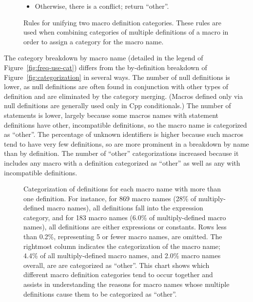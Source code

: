 \documentclass[10pt]{article}
\newcommand{\captionsmall}[1]{\caption[]{\small #1}}
\begin{document}
\begin{figure}
\begin{itemize}
\item Otherwise, there is a conflict; return ``other''.
\end{itemize}


\captionsmall{Rules for unifying two macro definition categories.  These
  rules are used when combining categories of multiple definitions of a
  macro in order to assign a category for the macro name.}
\label{fig:category-lub}
\end{figure}



The category breakdown by macro name (detailed in the legend of
Figure~\ref{fig:freq-use-cat}) differs from the by-definition breakdown of
Figure~\ref{fig:categorization} in several ways.  The number of null
definitions is lower, as null definitions are often found in conjunction
with other types of definition and are eliminated by the category merging.
(Macros defined only via null definitions are generally used only in Cpp
conditionals.)  The number of statements is lower, largely because
some macros names with statement definitions have other, incompatible
definitions, so the macro name is categorized as ``other''.  The percentage
of unknown identifiers is higher because such macros tend to have very few
definitions, so are more prominent in a breakdown by name than by
definition.  The number of ``other'' categorizations increased because it
includes any macro with a definition categorized as ``other'' as well as any
with incompatible definitions.


\begin{figure}
  {\small\centerline{}}
  
  \captionsmall{Categorization of definitions for each macro name with more
    than one definition.
    For instance, for 869 macro names (28\% of multiply-defined macro
    names), all definitions fall into the expression category, and for 183
    macro names (6.0\% of multiply-defined macro names), all definitions
    are either expressions or constants.
    Rows less than 0.2\%, representing 5 or fewer macro names, are omitted.
    The rightmost column indicates the categorization of the macro name; 
    4.4\% of all multiply-defined macro names, and 2.0\% macro names
    overall, are are categorized as ``other''.
    This chart shows which different macro definition categories tend
    to occur together and assists in understanding the reasons for macro names
    whose multiple definitions cause them to be categorized as ``other''.}

  \label{fig:subset-categories}
\end{figure}
\end{document}
